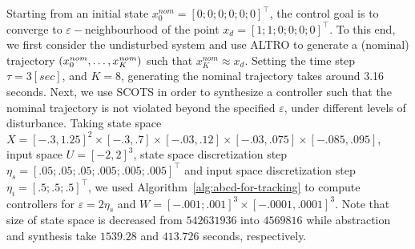 Starting from an initial state $x_0^{nom}=[0;0;0;0;0;0]^\top$, the control goal is to converge to $\varepsilon-$neighbourhood of the point 
$x_d=[1;1;0;0;0;0]^\top$. To this end, we first consider the undisturbed system and use ALTRO to generate a (nominal) trajectory $(x_0^{\mathit{nom}},\ldots,x_K^{\mathit{nom}})$ such that $x_K^{nom}\approx x_d$. Setting the time step $\tau=3[sec]$, and $K=8$, generating the nominal trajectory takes around 3.16 seconds. Next, we use SCOTS in order to synthesize a controller such that the nominal trajectory is not violated beyond the specified $\varepsilon$, under different levels of disturbance. Taking state space $X=[-.3,1.25]^2\times[-.3,.7]\times[-.03,.12]\times[-.03,.075]\times[-.085,.095]$, input space $U=[-2,2]^3$, state space discretization step $\eta_s=[.05;.05;.05;.005;.005;.005]^\top$ and input space discretization step $\eta_i=[.5;.5;.5]^\top$, we used Algorithm~\ref{alg:abcd-for-tracking} to compute controllers for $\varepsilon=2\eta_s$ and $W=[-.001;.001]^3\times[-.0001,.0001]^3$. Note that size of state space is decreased from $542631936$ into $4569816$ while abstraction and synthesis take $1539.28$ and $413.726$ seconds, respectively.





